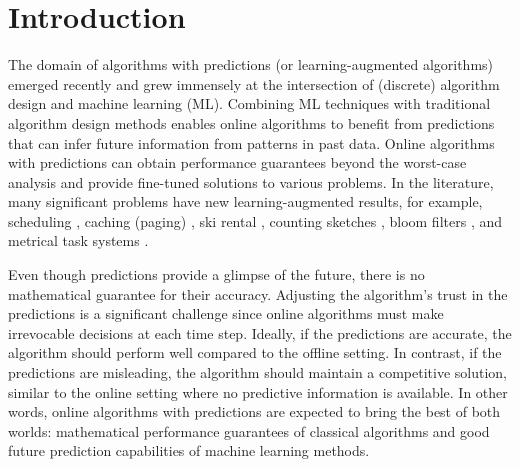 
\section{Introduction}


The domain of algorithms with predictions \cite{MitzenmacherVassilvitskii20:Beyond-the-Worst-Case}  (or learning-augmented algorithms) emerged recently and grew immensely at the intersection of (discrete) algorithm design and machine learning (ML).
Combining ML techniques with traditional algorithm design methods enables online algorithms to benefit from predictions that can infer future information from patterns in past data. Online algorithms with predictions can obtain performance guarantees beyond the worst-case analysis and provide fine-tuned solutions to various problems. In the literature, many significant problems have new learning-augmented results, for example, scheduling \cite{LattanziLavastida20:Online-scheduling,Mitzenmacher20:Scheduling-with}, caching (paging) \cite{LykourisVassilvtiskii18:Competitive-caching,Rohatgi20:Near-optimal-bounds,AntoniadisCoester20:Online-metric}, ski rental \cite{GollapudiPanigrahi19:Online-algorithms,KumarPurohit18:Improving-online,AngelopoulosDurr20:Online-Computation}, counting sketches \cite{HsuIndyk19:Learning-Based-Frequency}, bloom filters \cite{KraskaBeutel18:The-case-for-learned,Mitzenmacher18:A-model-for-learned}, and metrical task systems \cite{AntoniosEtAll23:mixing-predictions-metric-algorithms}.

Even though predictions provide a glimpse of the future, there is no mathematical guarantee for their accuracy. Adjusting the algorithm's trust in the predictions is a significant challenge since online algorithms must make irrevocable decisions at each time step. Ideally, if the predictions are accurate, the algorithm should perform well compared to the offline setting. In contrast, if the predictions are misleading, the algorithm should maintain a competitive solution, similar to the online setting where no predictive information is available. In other words, online algorithms with predictions are expected to bring the best of both worlds: mathematical performance guarantees of classical algorithms and good future prediction capabilities of machine learning methods.

